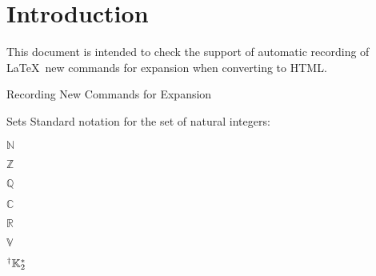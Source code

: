 \documentclass{article}
\providecommand{\N}{\mathbb{N}}
\newcommand{\C}{\mathcal{C}}
\renewcommand{\C}{\mathbb{C}}
\newcommand{\Z}{\mathbb{Z}}
\newcommand*{\R}{\mathbb{R}}
\newcommand{\Q}{\mathbb{Q}}
\newcommand{\prepostbb}[3]{#1\mathbb{#2}#3}
\begin{document}
\section*{Introduction}

This document is intended to check the support of automatic recording of 
\LaTeX\ new commands for expansion when converting to HTML.

\begin{quiz}{Recording New Commands for Expansion}

\begin{multi}{Sets}
Standard notation for the set of natural integers: 
\item* $\N$
\item $\Z$
\item $\Q$
\item $\C$
\item $\R$
\item $\prepostbb{}{V}{}$
\item $\prepostbb{\vphantom{K}^\dagger}{K}{^*_2}$
\end{multi}

\end{quiz}
\end{document}
